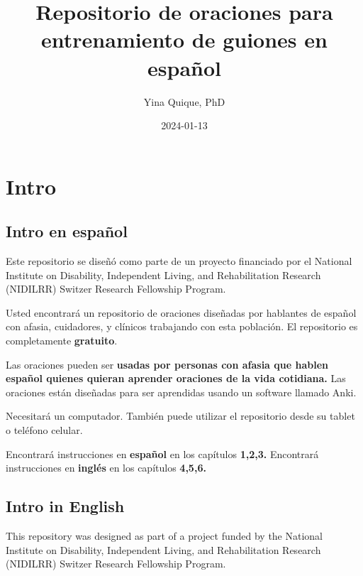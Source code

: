 \documentclass[
]{book}
\title{Repositorio de oraciones para entrenamiento de guiones en español}
\author{Yina Quique, PhD}
\date{2024-01-13}
\begin{document}
\maketitle

{
\setcounter{tocdepth}{1}
\tableofcontents
}
\hypertarget{intro}{%
\chapter*{Intro}\label{intro}}

\hypertarget{intro-en-espauxf1ol}{%
\section*{\texorpdfstring{Intro en \textbf{español}}{Intro en español}}\label{intro-en-espauxf1ol}}

Este repositorio se diseñó como parte de un proyecto financiado por el National Institute on Disability, Independent Living, and Rehabilitation Research (NIDILRR) Switzer Research Fellowship Program.

Usted encontrará un repositorio de oraciones diseñadas por hablantes de español con afasia, cuidadores, y clínicos trabajando con esta población. El repositorio es completamente \textbf{gratuito}.

Las oraciones pueden ser \textbf{usadas por personas con afasia que hablen español quienes quieran aprender oraciones de la vida cotidiana.} Las oraciones están diseñadas para ser aprendidas usando un software llamado Anki.

Necesitará un computador. También puede utilizar el repositorio desde su tablet o teléfono celular.

Encontrará instrucciones en \textbf{español} en los capítulos \textbf{1,2,3.}
Encontrará instrucciones en \textbf{inglés} en los capítulos \textbf{4,5,6.}

\hypertarget{intro-in-english}{%
\section*{\texorpdfstring{Intro in \textbf{English}}{Intro in English}}\label{intro-in-english}}

This repository was designed as part of a project funded by the National Institute on Disability, Independent Living, and Rehabilitation Research (NIDILRR) Switzer Research Fellowship Program.
\end{document}

